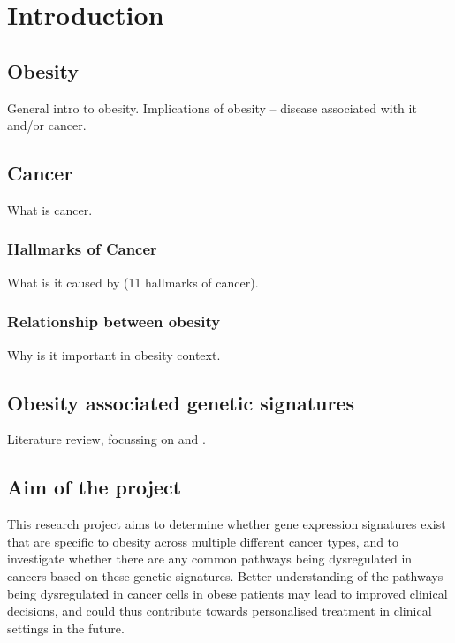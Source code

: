 \chapter{Introduction}
\label{ch:intro}

\section{Obesity}
\label{sec:obesity}

General intro to obesity.
Implications of obesity -- disease associated with it and/or cancer.

\section{Cancer}
\label{sec:cancer}

What is cancer.

\subsection{Hallmarks of Cancer}
\label{subsec:cancerhallmarks}

What is it caused by (11 hallmarks of cancer).

\subsection{Relationship between obesity}
\label{subsec:obsbackground}

Why is it important in obesity context.

\section{Obesity associated genetic signatures}
\label{sec:obsgene}

Literature review, focussing on \citet{Creighton2012} and \citet{Fuentes-Mattei2014}.

\section{Aim of the project}
\label{sec:aim}

This research project aims to determine whether gene expression signatures exist that are specific to obesity across multiple different cancer types, and to investigate whether there are any common pathways being dysregulated in cancers based on these genetic signatures.
Better understanding of the pathways being dysregulated in cancer cells in obese patients may lead to improved clinical decisions, and could thus contribute towards personalised treatment in clinical settings in the future.

